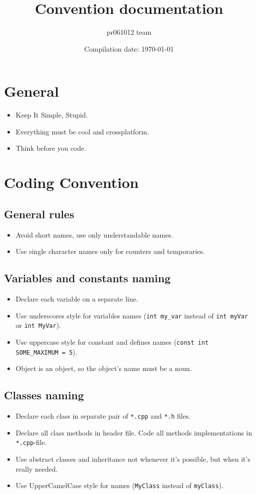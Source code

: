 \documentclass[12pt]{article}
\title{Convention documentation}
\author{pr061012 team}
\date{Compilation date: \today}
\newcommand{\code}[1]{\colorbox{verylightgray}{\lstinline!#1!}}
\begin{document}
	\maketitle

	\section{General}
		\begin{itemize}
			\item Keep It Simple, Stupid.
			\item Everything must be cool and crossplatform.
			\item Think before you code.
		\end{itemize}

	\section{Coding Convention}
		\subsection{General rules}
			\begin{itemize}
				\item Avoid short names, use only understandable names.
				\item Use single character names only for counters and temporaries.
			\end{itemize}

		\subsection{Variables and constants naming}
			\begin{itemize}
				\item Declare each variable on a separate line.
				\item Use underscores style for variables names (\code{int my_var} instead of \code{int myVar} or \code{int MyVar}).
				\item Use uppercase style for constant and defines names (\code{const int SOME_MAXIMUM = 5}).
				\item Object is an object, so the object's name must be a noun.
			\end{itemize}

		\subsection{Classes naming}
			\begin{itemize}
				\item Declare each class in separate pair of \code{*.cpp} and \code{*.h} files.
				\item Declare all class methods in header file. Code all methods implementations in \code{*.cpp}-file.
				\item Use abstract classes and inheritance not whenever it's possible, but when it's really needed.
				\item Use UpperCamelCase style for names (\code{MyClass} instead of \code{myClass}).
			\end{itemize}
\end{document}
